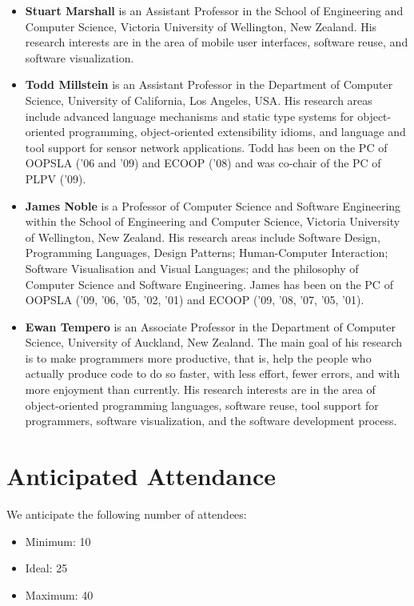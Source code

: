 \documentclass{sigplanconf}
\begin{document}
\begin{itemize}
\item \textbf{Stuart Marshall} is an Assistant Professor in the School
  of Engineering and Computer Science, Victoria University of
  Wellington, New Zealand. His research interests are in the area of
  mobile user interfaces, software reuse, and software visualization.

\item \textbf{Todd Millstein} is an Assistant Professor in the
  Department of Computer Science, University of California, Los
  Angeles, USA. His research areas include advanced language
  mechanisms and static type systems for object-oriented programming,
  object-oriented extensibility idioms, and language and tool support
  for sensor network applications. Todd has been on the PC of OOPSLA
  ('06 and '09) and ECOOP ('08) and was co-chair of the PC of PLPV
  ('09).

\item \textbf{James Noble} is a Professor of Computer Science and
  Software Engineering within the School of Engineering and Computer
  Science, Victoria University of Wellington, New Zealand.  His
  research areas include Software Design, Programming Languages,
  Design Patterns; Human-Computer Interaction; Software Visualisation
  and Visual Languages; and the philosophy of Computer Science and
  Software Engineering. James has been on the PC of OOPSLA ('09, '06,
  '05, '02, '01) and ECOOP ('09, '08, '07, '05, '01).

\item \textbf{Ewan Tempero} is an Associate Professor in the
  Department of Computer Science, University of Auckland, New
  Zealand. The main goal of his research is to make programmers more
  productive, that is, help the people who actually produce code to do
  so faster, with less effort, fewer errors, and with more enjoyment
  than currently. His research interests are in the area of
  object-oriented programming languages, software reuse, tool support
  for programmers, software visualization, and the software
  development process.

\end{itemize}

\section{Anticipated Attendance}

We anticipate the following number of attendees:

\begin{itemize}
\item Minimum: 10 
\item Ideal: 25 
\item Maximum: 40 
\end{itemize}
\end{document}
